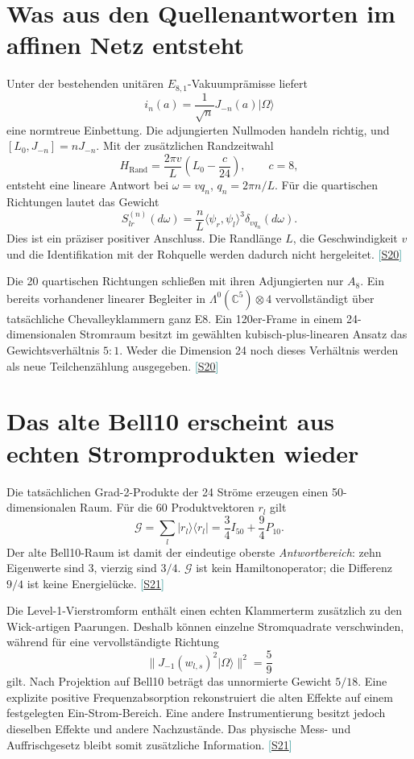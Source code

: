 \documentclass[11pt,a4paper,oneside,parskip=half,headings=normal,numbers=noenddot,bibliography=totoc]{scrreprt}
\newcommand{\C}{\mathbb C}
\newcommand{\ket}[1]{\lvert #1\rangle}
\newcommand{\bra}[1]{\langle #1\rvert}
\newcommand{\src}[1]{\textcolor{teal}{\small[\hyperref[s:#1]{S#1}]}}
\begin{document}
\section{Was aus den Quellenantworten im affinen Netz entsteht}
Unter der bestehenden unitären $E_{8,1}$-Vakuumprämisse liefert
\[
 i_n(a)=\frac1{\sqrt n}J_{-n}(a)\ket\Omega
\]
eine normtreue Einbettung. Die adjungierten Nullmoden handeln richtig, und $[L_0,J_{-n}]=nJ_{-n}$. Mit der zusätzlichen Randzeitwahl
\[
 H_{\mathrm{Rand}}=\frac{2\pi v}{L}\left(L_0-\frac c{24}\right),
 \qquad c=8,
\]
entsteht eine lineare Antwort bei $\omega=vq_n$, $q_n=2\pi n/L$. Für die quartischen Richtungen lautet das Gewicht
\[
 S_{lr}^{(n)}(d\omega)=\frac nL
 \langle\psi_r,\psi_l\rangle^3\delta_{vq_n}(d\omega).
\]
Dies ist ein präziser positiver Anschluss. Die Randlänge $L$, die Geschwindigkeit $v$ und die Identifikation mit der Rohquelle werden dadurch nicht hergeleitet. \src{20}

Die 20 quartischen Richtungen schließen mit ihren Adjungierten nur $A_8$. Ein bereits vorhandener linearer Begleiter in $\Lambda^0(\C^5)\otimes4$ vervollständigt über tatsächliche Chevalleyklammern ganz E8. Ein 120er-Frame in einem 24-dimensionalen Stromraum besitzt im gewählten kubisch-plus-linearen Ansatz das Gewichtsverhältnis $5:1$. Weder die Dimension 24 noch dieses Verhältnis werden als neue Teilchenzählung ausgegeben. \src{20}

\section{Das alte Bell10 erscheint aus echten Stromprodukten wieder}
Die tatsächlichen Grad-2-Produkte der 24 Ströme erzeugen einen 50-dimensionalen Raum. Für die 60 Produktvektoren $r_l$ gilt
\[
 \mathcal G=\sum_l\ket{r_l}\bra{r_l}
 =\frac34I_{50}+\frac94P_{10}.
\]
Der alte Bell10-Raum ist damit der eindeutige oberste \emph{Antwortbereich}: zehn Eigenwerte sind $3$, vierzig sind $3/4$. $\mathcal G$ ist kein Hamiltonoperator; die Differenz $9/4$ ist keine Energielücke. \src{21}

Die Level-1-Vierstromform enthält einen echten Klammerterm zusätzlich zu den Wick-artigen Paarungen. Deshalb können einzelne Stromquadrate verschwinden, während für eine vervollständigte Richtung
\[
 \|J_{-1}(w_{l,s})^2\ket\Omega\|^2=\frac59
\]
gilt. Nach Projektion auf Bell10 beträgt das unnormierte Gewicht $5/18$. Eine explizite positive Frequenzabsorption rekonstruiert die alten Effekte auf einem festgelegten Ein-Strom-Bereich. Eine andere Instrumentierung besitzt jedoch dieselben Effekte und andere Nachzustände. Das physische Mess- und Auffrischgesetz bleibt somit zusätzliche Information. \src{21}
\end{document}
